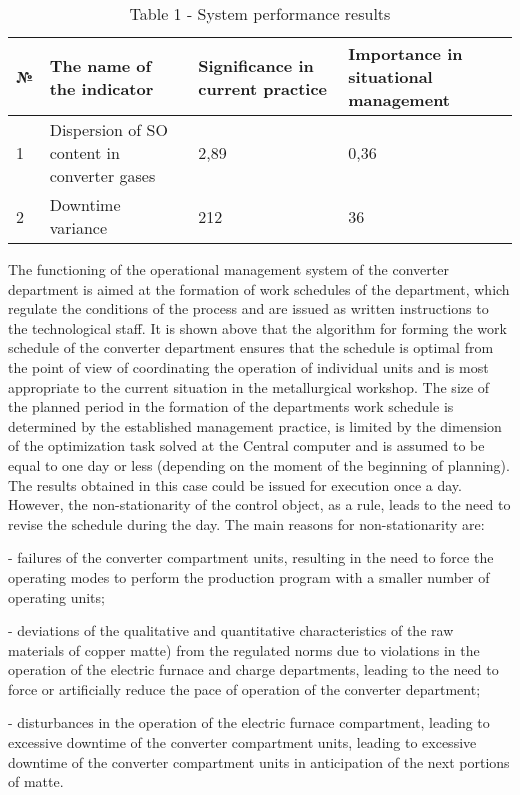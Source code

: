 \begin{table}[H]
\caption*{Table 1 - System performance results}
\centering
\begin{tabular}{|l|p{}|p{}|p{}|}
\hline
№ & The name of the indicator & Significance in current practice & Importance in situational management \\ \hline
1 & Dispersion of SO content in converter gases & 2,89 & 0,36 \\ \hline
2 & Downtime variance & 212 & 36 \\ \hline
\end{tabular}
\end{table}

\begin{multicols}{2}
The functioning of the operational management system of the converter
department is aimed at the formation of work schedules of the
department, which regulate the conditions of the process and are issued
as written instructions to the technological staff. It is shown above
that the algorithm for forming the work schedule of the converter
department ensures that the schedule is optimal from the point of view
of coordinating the operation of individual units and is most
appropriate to the current situation in the metallurgical workshop. The
size of the planned period in the formation of the
department\textquotesingle s work schedule is determined by the
established management practice, is limited by the dimension of the
optimization task solved at the Central computer and is assumed to be
equal to one day or less (depending on the moment of the beginning of
planning). The results obtained in this case could be issued for
execution once a day. However, the non-stationarity of the control
object, as a rule, leads to the need to revise the schedule during the
day. The main reasons for non-stationarity are:

- failures of the converter compartment units, resulting in the need to
force the operating modes to perform the production program with a
smaller number of operating units;

- deviations of the qualitative and quantitative characteristics of the
raw materials of copper matte) from the regulated norms due to
violations in the operation of the electric furnace and charge
departments, leading to the need to force or artificially reduce the
pace of operation of the converter department;

- disturbances in the operation of the electric furnace compartment,
leading to excessive downtime of the converter compartment units,
leading to excessive downtime of the converter compartment units in
anticipation of the next portions of matte.


\end{multicols}
